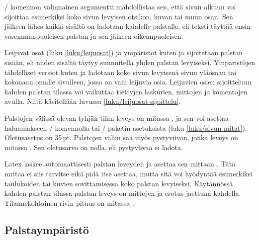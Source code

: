 \begin{koodilohkosis}
\end{koodilohkosis}

\noindent
{}\-/ komennon valinnainen argumentti mahdollistaa sen,
että sivun alkuun voi sijoittaa esimerkiksi koko sivun levyisen otsikon,
kuvan tai muun osan. Sen jälkeen lähes kaikki sisältö on ladotaan
kahdelle palstalle, eli teksti täyttää ensin vasemmanpuoleisen palstan
ja sen jälkeen oikeanpuoleisen.

Leijuvat osat (luku \ref{luku/leijuosat}) ja ympäristöt kuten
 ja  sijoitetaan palstan sisään, eli
niiden sisältö täytyy suunnitella yhden palstan levyiseksi. Ympäristöjen
tähdelliset versiot kuten  ja 
ladotaan koko sivun levyisenä sivun yläosaan tai kokonaan omalle
sivulleen, jossa on vain leijuvia osia. Leijuvien osien sijoitteluun
kahden palstan tilassa voi vaikuttaa tiettyjen laskurien, mittojen ja
komentojen avulla. Niitä käsitellään luvussa
\ref{luku/leijuosat-sijoittelu}.

Palstojen välissä olevan tyhjän tilan leveys on mitassa
, ja sen voi asettaa haluamakseen
\-/ komennolla tai \-/ paketin
asetuksista (luku \ref{luku/sivun-mitat}). Oletusasetus on 35\,pt.
Palstojen väliin saa myös pystyviivan, jonka leveys on mitassa
. Sen oletusarvo on nolla, eli pystyviivaa ei
ladota.

\begin{koodilohkosis}
\setlength{\columnsep}{6mm}       %
\setlength{\columnseprule}{.2mm}  %
\end{koodilohkosis}

\noindent
Latex laskee automaattisesti palstan leveyden ja asettaa sen mittaan
. Tätä mittaa ei siis tarvitse eikä pidä itse
asettaa, mutta sitä voi hyödyntää esimerkiksi taulukoiden tai kuvien
sovittamisessa koko palstan levyiseksi. Käytännössä kahden palstan
tilassa palstan leveys on mittojen  ja
 erotus jaettuna kahdella. Tilannekohtainen rivin
pituus on mitassa .

\subsection{Palstaympäristö}
\label{luku/multicol}

